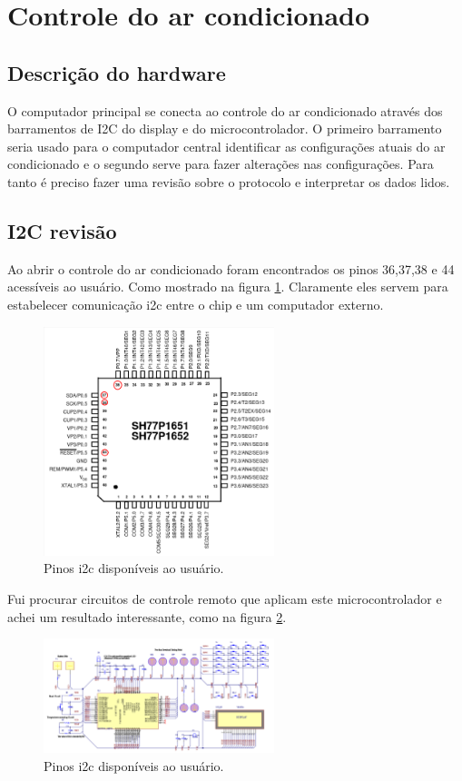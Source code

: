 \documentclass[11pt]{article}
\begin{document}
\section{Controle do ar condicionado}
\label{sec:orgd5c48c9}
\subsection{Descrição do hardware}
\label{sec:orgb3ef852}
O computador principal se conecta ao controle do ar condicionado através dos barramentos de I2C do display e do microcontrolador. O primeiro barramento seria usado para o computador central identificar as configurações atuais do ar condicionado e o segundo serve para fazer alterações nas configurações. Para tanto é preciso fazer uma revisão sobre o protocolo e interpretar os dados lidos.
\subsection{I2C revisão}
\label{sec:org2aee7c8}
Ao abrir o controle do ar condicionado foram encontrados os pinos 36,37,38 e 44 acessíveis ao usuário. Como mostrado na figura \ref{fig:i2c_sh77}. Claramente eles servem para estabelecer comunicação i2c entre o chip e um computador externo.
\begin{figure}[h!]
\caption{\label{fig:i2c_sh77}Pinos i2c disponíveis ao usuário.}
\centering
\includegraphics[width=0.6\textwidth]{./i2c_sh77.png}
\end{figure}

Fui procurar circuitos de controle remoto que aplicam este microcontrolador e achei um resultado interessante, como na figura \ref{fig:sh77_example}.

\begin{figure}[h!]
\caption{\label{fig:sh77_example}Pinos i2c disponíveis ao usuário.}
\centering
\includegraphics[width=0.6\textwidth]{./sh77_example.png}
\end{figure}
\end{document}
